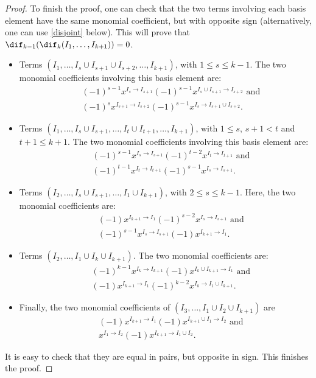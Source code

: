\begin{proof}
To finish the proof, one can check that the two terms involving each
basis element have the same monomial coefficient, but with opposite
sign (alternatively, one can use \eqref{disjoint} below). This will
prove that $\dif_{k-1}(\dif_{k}(I_1,\ldots,I_{k+1}))=0$.
\begin{itemize}
\item Terms $(I_1,\ldots,I_s\cup I_{s+1}\cup I_{s+2},\ldots
  ,I_{k+1})$, with $1\leq s\leq k-1$. The two monomial coefficients
  involving this basis element are:
\begin{eqnarray*}
&& (-1)^{s-1}x^{I_{s}\to I_{s+1}}(-1)^{s-1}x^{I_{s}\cup I_{s+1}\to
    I_{s+2}}\mbox{ and }\\ && (-1)^{s}x^{I_{s+1}\to
    I_{s+2}}(-1)^{s-1}x^{I_{s}\to I_{s+1}\cup I_{s+2}}.
\end{eqnarray*}
\item Terms $(I_1,\ldots,I_s\cup I_{s+1},\ldots ,I_{t}\cup
  I_{t+1},\ldots,I_{k+1})$, with $1\leq s$, $s+1<t$ and $t+1\leq k+1$.
  The two monomial coefficients involving this basis element are:
\begin{eqnarray*}
&& (-1)^{s-1}x^{I_{s}\to I_{s+1}}(-1)^{t-2}x^{I_{t}\to
    I_{t+1}}\mbox{ and }\\ && (-1)^{t-1}x^{I_{t}\to I_{t+1}}(-1)^{s-1}x^{I_{s}\to
    I_{s+1}}.
\end{eqnarray*}
\item Terms $(I_2,\ldots ,I_s\cup I_{s+1},\ldots ,I_1\cup I_{k+1})$,
  with $2\leq s\leq k-1$. Here, the two monomial coefficients are:
\begin{eqnarray*}
&& (-1)x^{I_{k+1}\to I_1}(-1)^{s-2}x^{I_s\to I_{s+1}}\mbox{ and }\\ &&
  (-1)^{s-1}x^{I_s\to I_{s+1}}(-1)x^{I_{k+1}\to I_{1}}.
\end{eqnarray*}
\item Terms $(I_2,\ldots ,I_1\cup I_{k}\cup I_{k+1})$. The two
  monomial coefficients are:
\begin{eqnarray*}
&& (-1)^{k-1}x^{I_k\to I_{k+1}}(-1)x^{I_{k}\cup I_{k+1}\to I_1}\mbox{ and }
\\ && (-1)x^{I_{k+1}\to
    I_1}(-1)^{k-2}x^{I_{k}\to I_1\cup I_{k+1}}. 
\end{eqnarray*}
\item Finally, the two monomial coefficients of $(I_3,\ldots ,I_1\cup
I_2\cup I_{k+1})$ are 
\begin{eqnarray*}
&& (-1)x^{I_{k+1}\to I_1}(-1)x^{I_{k+1}\cup I_1\to I_2}\mbox{ and }\\ && 
x^{I_1\to I_2}(-1)x^{I_{k+1}\to I_1\cup I_2}.
\end{eqnarray*}
\end{itemize}
It is easy to check that they are equal in pairs, but opposite in
sign. This finishes the proof.
\end{proof}

